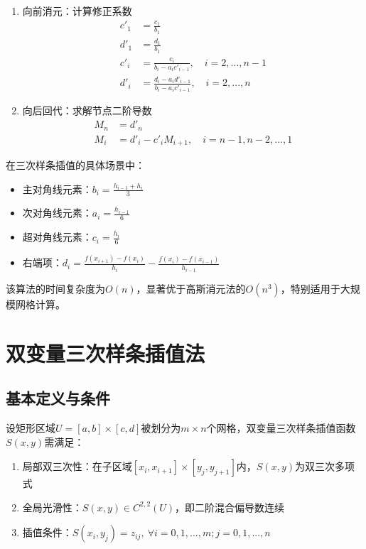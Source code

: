 \begin{enumerate}
    \item {向前消元}：计算修正系数
    \begin{align}
        c'_1 &= \frac{c_1}{b_1} \\
        d'_1 &= \frac{d_1}{b_1} \\
        c'_i &= \frac{c_i}{b_i - a_i c'_{i-1}}, \quad i=2,...,n-1 \\
        d'_i &= \frac{d_i - a_i d'_{i-1}}{b_i - a_i c'_{i-1}}, \quad i=2,...,n
    \end{align}

    \item{向后回代}：求解节点二阶导数
    \begin{align}
        M_n &= d'_n \\
        M_i &= d'_i - c'_i M_{i+1}, \quad i=n-1,n-2,...,1
    \end{align}
\end{enumerate}

在三次样条插值的具体场景中：
\begin{itemize}
    \item 主对角线元素：$b_i = \frac{h_{i-1} + h_i}{3}$
    \item 次对角线元素：$a_i = \frac{h_{i-1}}{6}$
    \item 超对角线元素：$c_i = \frac{h_i}{6}$
    \item 右端项：$d_i = \frac{f(x_{i+1}) - f(x_i)}{h_i} - \frac{f(x_i) - f(x_{i-1})}{h_{i-1}}$
\end{itemize}

该算法的时间复杂度为$O(n)$，显著优于高斯消元法的$O(n^3)$，特别适用于大规模网格计算\cite{deboor1978}。
\section{双变量三次样条插值法}
\subsection{基本定义与条件}
设矩形区域$U = [a,b] \times [c,d]$被划分为$m \times n$个网格，双变量三次样条插值函数$S(x,y)$需满足：
\begin{enumerate}
    \item {局部双三次性}：在子区域$[x_i,x_{i+1}] \times [y_j,y_{j+1}]$内，$S(x,y)$为双三次多项式
    \item{全局光滑性}：$S(x,y) \in C^{2,2}(U)$，即二阶混合偏导数连续
    \item {插值条件}：$S(x_i,y_j) = z_{ij},\ \forall i=0,1,...,m; j=0,1,...,n$
\end{enumerate}

